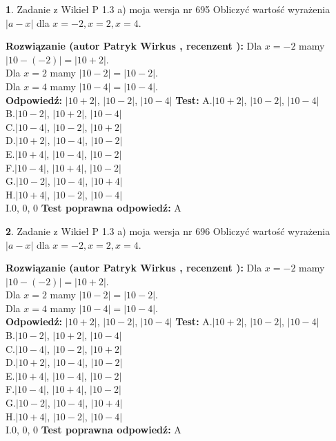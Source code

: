 \documentclass[12pt, a4paper]{article}
\theoremstyle{definition} %
\newtheorem{zad}{}
\newcommand{\zadStart}[1]{\begin{zad}#1\newline}
\newcommand{\zadStop}{\end{zad}}
\newcommand{\rozwStart}[2]{\noindent \textbf{Rozwiązanie (autor #1 , recenzent #2): }\newline}
\newcommand{\rozwStop}{\newline}
\newcommand{\odpStart}{\noindent \textbf{Odpowiedź:}\newline}
\newcommand{\odpStop}{\newline}
\newcommand{\testStart}{\noindent \textbf{Test:}\newline}
\newcommand{\testStop}{\newline}
\newcommand{\kluczStart}{\noindent \textbf{Test poprawna odpowiedź:}\newline}
\newcommand{\kluczStop}{\newline}
\begin{document}
\zadStart{Zadanie z Wikieł P 1.3 a) moja wersja nr 695}
Obliczyć wartość wyrażenia $|a - x|$ dla $x=-2,x=2,x=4$.
\zadStop
\rozwStart{Patryk Wirkus}{}
Dla $x = -2$ mamy $|10 - (-2)| = |10 + 2|$.\\
Dla $x = 2$ mamy $|10 - 2| = |10 - 2|$.\\
Dla $x = 4$ mamy $|10 - 4| = |10 - 4|$.\\
\rozwStop
\odpStart
$|10 + 2|$, $|10 - 2|$, $|10 - 4|$
\odpStop
\testStart
A.$|10 + 2|$, $|10 - 2|$, $|10 - 4|$\\
B.$|10 - 2|$, $|10 + 2|$, $|10 - 4|$\\
C.$|10 - 4|$, $|10 - 2|$, $|10 + 2|$\\
D.$|10 + 2|$, $|10 - 4|$, $|10 - 2|$\\
E.$|10 + 4|$, $|10 - 4|$, $|10 - 2|$\\
F.$|10 - 4|$, $|10 + 4|$, $|10 - 2|$\\
G.$|10 - 2|$, $|10 - 4|$, $|10 + 4|$\\
H.$|10 + 4|$, $|10 - 2|$, $|10 - 4|$\\
I.$0$, $0$, $0$
\testStop
\kluczStart
A
\kluczStop



\zadStart{Zadanie z Wikieł P 1.3 a) moja wersja nr 696}
Obliczyć wartość wyrażenia $|a - x|$ dla $x=-2,x=2,x=4$.
\zadStop
\rozwStart{Patryk Wirkus}{}
Dla $x = -2$ mamy $|10 - (-2)| = |10 + 2|$.\\
Dla $x = 2$ mamy $|10 - 2| = |10 - 2|$.\\
Dla $x = 4$ mamy $|10 - 4| = |10 - 4|$.\\
\rozwStop
\odpStart
$|10 + 2|$, $|10 - 2|$, $|10 - 4|$
\odpStop
\testStart
A.$|10 + 2|$, $|10 - 2|$, $|10 - 4|$\\
B.$|10 - 2|$, $|10 + 2|$, $|10 - 4|$\\
C.$|10 - 4|$, $|10 - 2|$, $|10 + 2|$\\
D.$|10 + 2|$, $|10 - 4|$, $|10 - 2|$\\
E.$|10 + 4|$, $|10 - 4|$, $|10 - 2|$\\
F.$|10 - 4|$, $|10 + 4|$, $|10 - 2|$\\
G.$|10 - 2|$, $|10 - 4|$, $|10 + 4|$\\
H.$|10 + 4|$, $|10 - 2|$, $|10 - 4|$\\
I.$0$, $0$, $0$
\testStop
\kluczStart
A
\kluczStop
\end{document}
